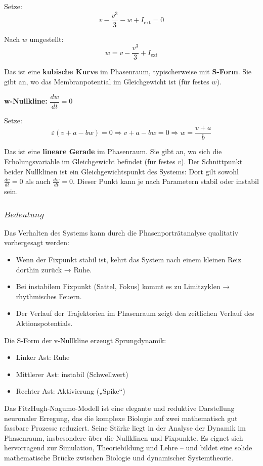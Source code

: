 \begin{refsection}
Setze:
\[
v - \frac{v^3}{3} - w + I_{\text{ext}} = 0
\]

Nach $w$ umgestellt:
\[
w = v - \frac{v^3}{3} + I_{\text{ext}}
\]

Das ist eine \textbf{kubische Kurve} im Phasenraum, typischerweise mit \textbf{S-Form}.  
Sie gibt an, wo das Membranpotential im Gleichgewicht ist (für festes $w$).

\vspace{1em}

\textbf{w-Nullkline:} $\dfrac{dw}{dt} = 0$

Setze:
\[
\varepsilon (v + a - b w) = 0 \Rightarrow v + a - b w = 0 \Rightarrow w = \frac{v + a}{b}
\]

Das ist eine \textbf{lineare Gerade} im Phasenraum.  
Sie gibt an, wo sich die Erholungsvariable im Gleichgewicht befindet (für festes $v$).
Der Schnittpunkt beider Nullklinen ist ein Gleichgewichtspunkt des Systems: Dort gilt sowohl $\frac{dv}{dt} = 0$ als auch $\frac{dw}{dt} = 0$. Dieser Punkt kann je nach Parametern stabil oder instabil sein.
\subsubsection{$Bedeutung$}
Das Verhalten des Systems kann durch die Phasenporträtanalyse qualitativ vorhergesagt werden:
\begin{itemize}
	\item Wenn der Fixpunkt stabil ist, kehrt das System nach einem kleinen Reiz dorthin zurück → Ruhe.
	\item Bei instabilem Fixpunkt (Sattel, Fokus) kommt es zu Limitzyklen → rhythmisches Feuern.
	\item Der Verlauf der Trajektorien im Phasenraum zeigt den zeitlichen Verlauf des Aktionspotentials.
\end{itemize}
Die S-Form der v-Nullkline erzeugt Sprungdynamik:
\begin{itemize}
	\item Linker Ast: Ruhe
	\item Mittlerer Ast: instabil (Schwellwert)
	\item Rechter Ast: Aktivierung („Spike“)
\end{itemize}
Das FitzHugh-Nagumo-Modell ist eine elegante und reduktive Darstellung neuronaler Erregung, das die komplexe Biologie auf zwei mathematisch gut fassbare Prozesse reduziert. Seine Stärke liegt in der Analyse der Dynamik im Phasenraum, insbesondere über die Nullklinen und Fixpunkte. Es eignet sich hervorragend zur Simulation, Theoriebildung und Lehre – und bildet eine solide mathematische Brücke zwischen Biologie und dynamischer Systemtheorie.

%
%
%
%
%

\printbibliography[heading=subbibliography]
\end{refsection}
